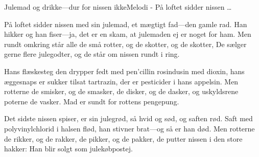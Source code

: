 \begin{sang}{Julemad og drikke---dur for nissen ikke}{Melodi - På loftet sidder nissen \ldots}
\begin{vers}
På loftet sidder nissen med sin julemad,
et mægtigt fad---den gamle rad.
Han hikker og han fiser---ja, det er en skam,
at julemaden ej er noget for ham.
Men rundt omkring står alle de små rotter,
og de skotter, og de skotter,
De sælger gerne flere julegodter,
og de står om nissen rundt i ring.
\end{vers}
\begin{vers}
Hans flæskesteg den drypper fedt med pen'cillin
rosindusin med dioxin,
hans æggesnaps er sukker tilsat tartrazin,
der er pesticider i hans appelsin.
Men rotterne de smisker, og de smasker,
de disker, og de dasker,
og uskyldsrene poterne de vasker.
Mad er sundt for rottens pengepung.
\end{vers}
\begin{vers}
Det sidste nissen spiser, er sin julegrød,
så hvid og sød, og saften rød.
Saft med polyvinylchlorid i halsen flød,
han stivner brat---og så er han død.
Men rotterne de rikker, og de rakker,
de pikker, og de pakker,
de putter nissen i den store hakker:
Han blir solgt som julekøbpostej.
\end{vers}
\end{sang}